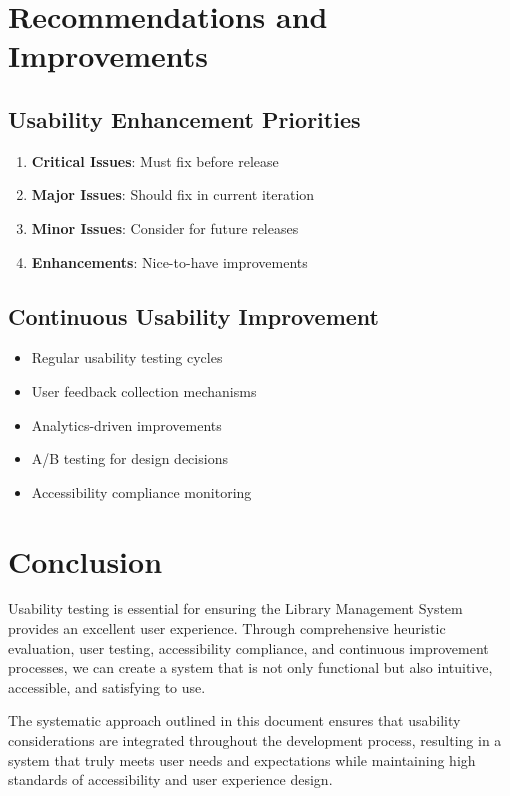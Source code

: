 \documentclass[12pt,a4paper]{article}
\begin{document}
\section{Recommendations and Improvements}

\subsection{Usability Enhancement Priorities}
\begin{enumerate}
    \item \textbf{Critical Issues}: Must fix before release
    \item \textbf{Major Issues}: Should fix in current iteration
    \item \textbf{Minor Issues}: Consider for future releases
    \item \textbf{Enhancements}: Nice-to-have improvements
\end{enumerate}

\subsection{Continuous Usability Improvement}
\begin{itemize}
    \item Regular usability testing cycles
    \item User feedback collection mechanisms
    \item Analytics-driven improvements
    \item A/B testing for design decisions
    \item Accessibility compliance monitoring
\end{itemize}

\section{Conclusion}

Usability testing is essential for ensuring the Library Management System provides an excellent user experience. Through comprehensive heuristic evaluation, user testing, accessibility compliance, and continuous improvement processes, we can create a system that is not only functional but also intuitive, accessible, and satisfying to use.

The systematic approach outlined in this document ensures that usability considerations are integrated throughout the development process, resulting in a system that truly meets user needs and expectations while maintaining high standards of accessibility and user experience design.
\end{document}
